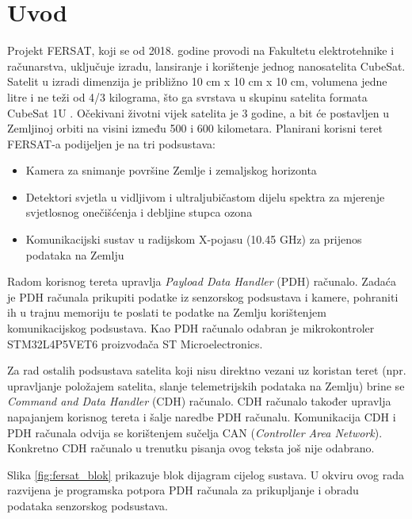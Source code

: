 \chapter{Uvod}
    Projekt FERSAT, koji se od 2018. godine provodi na Fakultetu elektrotehnike i računarstva, uključuje izradu, lansiranje i korištenje jednog nanosatelita CubeSat. Satelit u izradi dimenzija je približno 10 cm x 10 cm x 10 cm, volumena jedne litre i ne teži od 4/3 kilograma, što ga svrstava u skupinu satelita formata CubeSat 1U \cite{fersat_stranica_projekta}. Očekivani životni vijek satelita je 3 godine, a bit će postavljen u Zemljinoj orbiti na visini između 500 i 600 kilometara. Planirani korisni teret  FERSAT-a podijeljen je na tri podsustava:

    \begin{itemize}
        \item Kamera za snimanje površine Zemlje i zemaljskog horizonta
        \item Detektori svjetla u vidljivom i ultraljubičastom dijelu spektra za mjerenje svjetlosnog onečišćenja i debljine stupca ozona
        \item Komunikacijski sustav u radijskom X-pojasu (10.45 GHz) za prijenos podataka na Zemlju
    \end{itemize}

    Radom korisnog tereta upravlja \textit{Payload Data Handler} (PDH) računalo. Zadaća je PDH računala prikupiti podatke iz senzorskog podsustava i kamere, pohraniti ih u trajnu memoriju  te poslati te podatke na Zemlju korištenjem komunikacijskog podsustava. Kao PDH računalo odabran je mikrokontroler STM32L4P5VET6 proizvođača ST Microelectronics.

    Za rad ostalih podsustava satelita koji nisu direktno vezani uz koristan teret (npr. upravljanje položajem satelita, slanje telemetrijskih podataka na Zemlju) brine se \textit{Command and Data Handler} (CDH) računalo. CDH računalo također upravlja napajanjem korisnog tereta i šalje naredbe PDH računalu. Komunikacija CDH i PDH računala odvija se korištenjem sučelja CAN (\textit{Controller Area Network}). Konkretno CDH računalo u trenutku pisanja ovog teksta još nije odabrano.

    Slika \ref{fig:fersat_blok} prikazuje blok dijagram cijelog sustava. U okviru ovog rada razvijena je programska potpora PDH računala za prikupljanje i obradu podataka senzorskog podsustava.
    
